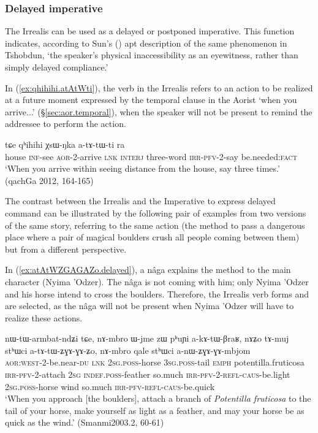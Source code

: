  
\subsubsection{Delayed imperative} \label{sec:irrealis.delayed.imp}
The Irrealis can be used as a delayed or postponed imperative. This function indicates, according to Sun's (\citeyear[809]{jackson07irrealis}) apt description of the same phenomenon in Tshobdun, `the  speaker’s  physical  inaccessibility  as  an  eyewitness,  rather  than  simply  delayed  compliance.'

In (\ref{ex:qhihihi.atAtWti}), the verb in the Irrealis  refers to an action to be realized at a future moment expressed by the temporal clause in the Aorist  `when you arrive...' (§\ref{sec:aor.temporal}), when the speaker will not be present to remind the addressee to perform the action.

\begin{exe}
\ex \label{ex:qhihihi.atAtWti}
 tɕe qʰihihi χsɯ-ŋka a-tɤ-tɯ-ti ra \\
house \textsc{inf}-see \textsc{aor}-2-arrive \textsc{lnk} \textsc{interj} three-word \textsc{irr}-\textsc{pfv}-2-say be.needed:\textsc{fact} \\
\glt `When you arrive within seeing distance from the house, say  three times.' (qachGa 2012, 164-165)
\end{exe}

The contrast between the Irrealis and the Imperative to express delayed command can be illustrated by the following pair of examples from two versions of the same story, referring to the same action (the method to pass a dangerous place where a pair of magical boulders crush all people coming between them) but from a different perspective. 

In (\ref{ex:atAtWZGAGAZo.delayed}), a nâga explains the method to the main character (Nyima 'Odzer). The nâga is not coming with him; only Nyima 'Odzer and his horse intend to cross the boulders. Therefore, the Irrealis verb forms  and  are selected, as the nâga will not be present when Nyima 'Odzer will have to realize these actions. 

\begin{exe}
\ex \label{ex:atAtWZGAGAZo.delayed}
\gll nɯ-tɯ-armbat-ndʑi tɕe, nɤ-mbro ɯ-jme zɯ pʰuɲi a-kɤ-tɯ-βraʁ, nɤʑo tɤ-muj stʰɯci a-tɤ-tɯ-ʑɣɤ-ɣɤ-ʑo, nɤ-mbro qale stʰɯci a-nɯ-ʑɣɤ-ɣɤ-mbjom \\
\textsc{aor}:\textsc{west}-2-be.near-\textsc{du} \textsc{lnk} \textsc{2sg}.\textsc{poss}-horse \textsc{3sg}.\textsc{poss}-tail \textsc{emph} potentilla.fruticosa \textsc{irr}-\textsc{pfv}-2-attach \textsc{2sg} \textsc{indef}.\textsc{poss}-feather so.much \textsc{irr}-\textsc{pfv}-2-\textsc{refl}-\textsc{caus}-be.light \textsc{2sg}.\textsc{poss}-horse wind so.much \textsc{irr}-\textsc{pfv}-\textsc{refl}-\textsc{caus}-be.quick \\
\glt `When you approach [the boulders], attach a branch of \textit{Potentilla fruticosa} to the tail of your horse, make yourself as light as a feather, and may your horse be as quick as the wind.' (Smanmi2003.2, 60-61)
\end{exe}

